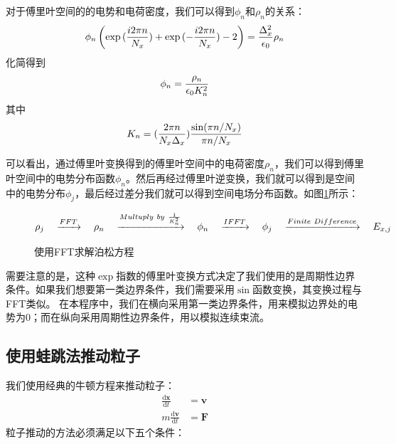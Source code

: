 {对于傅里叶空间的的电势和电荷密度，我们可以得到$\phi_{n}$和$\rho_{n}$的关系：
\begin{equation}\label{eq:FFT@PIC3}
\phi_{n}\left(\exp{(\frac{i2 \pi n}{N_x} )}  +  \exp{(-\frac{i2 \pi n}{N_x})} - 2 \right)
 = \frac{\Delta _{x}^{2}}{\epsilon _0} {\rho_n} \\
\end{equation}
化简得到
\begin{equation}\label{eq:FFT@PIC3}
\phi_{n} = \frac{\rho_n}{\epsilon _0 K_n^2} \\
\end{equation}
其中
\begin{equation}\label{eq:FFT@PIC4}
K_n = (\frac{2\pi n}{N_x \Delta _x}) \frac{\sin({\pi n}/{N_x})}{{\pi n}/{N_x}} \\
\end{equation}

可以看出，通过傅里叶变换得到的傅里叶空间中的电荷密度$\rho_{n}$，我们可以得到傅里叶空间中的电势分布函数$\phi_{n}$。然后再经过傅里叶逆变换，我们就可以得到是空间中的电势分布$\phi_{j}$，最后经过差分我们就可以得到空间电场分布函数。如图\ref{fig:PIC_FFT_Poisson}所示：
\begin{figure}[ht]
  \begin{equation*}
    \centering
    \rho_j \quad \xrightarrow{FFT} \quad \rho_n  \quad \xrightarrow{Multuply\ by\ \frac{1}{K_n^2}}   \quad  \phi_n  \quad \xrightarrow{IFFT} \quad  \phi_j \quad \xrightarrow{Finite\ Difference} \quad  E_{x,j}
  \end{equation*}
  \caption{使用FFT求解泊松方程}
  \label{fig:PIC_FFT_Poisson}
\end{figure}

需要注意的是，这种$\exp$指数的傅里叶变换方式决定了我们使用的是周期性边界条件。如果我们想要第一类边界条件，我们需要采用$\sin$函数变换，其变换过程与FFT类似。
在本程序中，我们在横向采用第一类边界条件，用来模拟边界处的电势为0；而在纵向采用周期性边界条件，用以模拟连续束流。

\subsection{使用蛙跳法推动粒子}

我们使用经典的牛顿方程来推动粒子：
\begin{align}
\label{eq:PIC_push1}
 \frac{\mathrm{d} \mathbf{x}}{\mathrm{d} t} &= \mathbf{v}  \\
\label{eq:PIC_push2}
m\frac{\mathrm{d} \mathbf{v}}{\mathrm{d} t} &= \mathbf{F}
\end{align}
粒子推动的方法必须满足以下五个条件：
}
